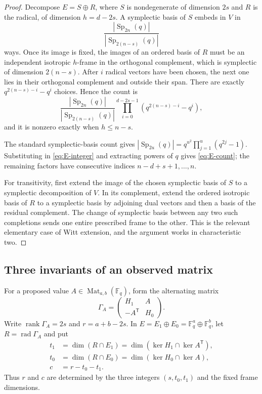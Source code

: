 \begin{proof}
Decompose $E=S\oplus R$, where $S$ is nondegenerate of dimension $2s$
and $R$ is the radical, of dimension $h=d-2s$. A symplectic basis of $S$
embeds in $V$ in
\[
 \frac{|\operatorname{Sp}_{2n}(q)|}
 {|\operatorname{Sp}_{2(n-s)}(q)|}
\]
ways. Once its image is fixed, the images of an ordered basis of $R$
must be an independent isotropic $h$-frame in the orthogonal complement,
which is symplectic of dimension $2(n-s)$. After $i$ radical vectors have
been chosen, the next one lies in their orthogonal complement and outside
their span. There are exactly
$q^{2(n-s)-i}-q^i$ choices. Hence the count is
\begin{equation}\label{eq:E-integer}
 \frac{|\operatorname{Sp}_{2n}(q)|}
 {|\operatorname{Sp}_{2(n-s)}(q)|}
 \prod_{i=0}^{d-2s-1}(q^{2(n-s)-i}-q^i),
\end{equation}
and it is nonzero exactly when $h\le n-s$.

The standard symplectic-basis count gives
$|\operatorname{Sp}_{2u}(q)|=q^{u^2}\prod_{j=1}^u(q^{2j}-1)$.
Substituting in \eqref{eq:E-integer} and extracting powers of $q$ gives
\eqref{eq:E-count}; the remaining factors have consecutive indices
$n-d+s+1,\ldots,n$.

For transitivity, first extend the image of the chosen symplectic basis
of $S$ to a symplectic decomposition of $V$. In its complement, extend
the ordered isotropic basis of $R$ to a symplectic basis by adjoining
dual vectors and then a basis of the residual complement. The change of
symplectic basis between any two such completions sends one entire
prescribed frame to the other. This is the relevant elementary case of
Witt extension, and the argument works in characteristic two.
\end{proof}

\subsection{Three invariants of an observed matrix}

For a proposed value $A\in\operatorname{Mat}_{a,b}(\mathbb F_q)$, form
the alternating matrix
\begin{equation}\label{eq:combined-Gram}
 \Gamma_A=
 \begin{pmatrix}H_1&A\\-A^{\mathsf T}&H_0\end{pmatrix}.
\end{equation}
Write $\operatorname{rank}\Gamma_A=2s$ and
$r=a+b-2s$. In $E=E_1\oplus E_0=\mathbb F_q^a\oplus\mathbb F_q^b$,
let $R=\operatorname{rad}\Gamma_A$ and put
\begin{align}
 t_1&=\dim(R\cap E_1)=\dim(\ker H_1\cap\ker A^{\mathsf T}),
 \label{eq:t1}\\
 t_0&=\dim(R\cap E_0)=\dim(\ker H_0\cap\ker A),
 \label{eq:t0}\\
 c&=r-t_0-t_1.\label{eq:complement-c}
\end{align}
Thus $r$ and $c$ are determined by the three integers $(s,t_0,t_1)$
and the fixed frame dimensions.

